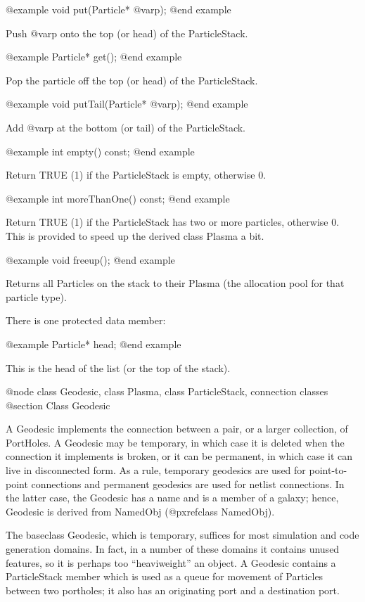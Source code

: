 @example
void put(Particle* @var{p});
@end example

Push @var{p} onto the top (or head) of the ParticleStack.

@example
Particle* get();
@end example

Pop the particle off the top (or head) of the ParticleStack.

@example
void putTail(Particle* @var{p});
@end example

Add @var{p} at the bottom (or tail) of the ParticleStack.

@example
int empty() const;
@end example

Return TRUE (1) if the ParticleStack is empty, otherwise 0.

@example
int moreThanOne() const;
@end example

Return TRUE (1) if the ParticleStack has two or more particles,
otherwise 0.  This is provided to speed up the derived class Plasma a
bit.

@example
void freeup();
@end example

Returns all Particles on the stack to their Plasma (the allocation pool
for that particle type).

There is one protected data member:

@example
Particle* head;
@end example

This is the head of the list (or the top of the stack).

@node class Geodesic, class Plasma, class ParticleStack, connection classes
@section Class Geodesic

A Geodesic implements the connection between a pair, or a larger
collection, of PortHoles.  A Geodesic may be temporary, in which case it
is deleted when the connection it implements is broken, or it can be
permanent, in which case it can live in disconnected form.  As a rule,
temporary geodesics are used for point-to-point connections and
permanent geodesics are used for netlist connections.  In the latter
case, the Geodesic has a name and is a member of a galaxy; hence,
Geodesic is derived from NamedObj (@pxref{class NamedObj}).

The baseclass Geodesic, which is temporary, suffices for most simulation
and code generation domains.  In fact, in a number of these domains it
contains unused features, so it is perhaps too ``heaviweight'' an object.
A Geodesic contains a ParticleStack member which is used as a queue for
movement of Particles between two portholes; it also has an originating
port and a destination port.

